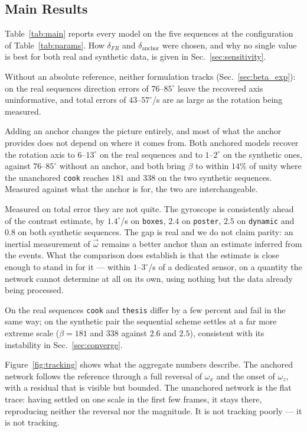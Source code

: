 \documentclass[journal]{IEEEtran}
\newcommand{\wvec}{\vec{\omega}}
\begin{document}
\subsection{Main Results}
\label{sec:mainresults}

Table~\ref{tab:main} reports every model on the five sequences at the
configuration of Table~\ref{tab:params}. How $\delta_{F\!R}$ and
$\delta_{\text{anchor}}$ were chosen, and why no single value is best for
both real and synthetic data, is given in Sec.~\ref{sec:sensitivity}.

Without an absolute reference, neither formulation tracks
(Sec.~\ref{sec:beta_exp}): on the real sequences direction errors of
$76$--$85^\circ$ leave the recovered axis uninformative, and total errors of
$43$--$57^\circ$/s are as large as the rotation being measured.

Adding an anchor changes the picture entirely, and most of what the anchor
provides does not depend on where it comes from. Both anchored models recover the
rotation axis to $6$--$13^\circ$ on the real sequences and to $1$--$2^\circ$ on
the synthetic ones, against $76$--$85^\circ$ without an anchor, and both bring
$\beta$ to within $14\%$ of unity where the unanchored \texttt{cook} reaches
$181$ and $338$ on the two synthetic sequences. Measured against what the anchor
is for, the two are interchangeable.

Measured on total error they are not quite. The gyroscope is consistently ahead
of the contrast estimate, by $1.4^\circ$/s on \texttt{boxes}, $2.4$ on
\texttt{poster}, $2.5$ on \texttt{dynamic} and $0.8$ on both synthetic
sequences. The gap is real and we do
not claim parity: an inertial measurement of $\wvec$ remains a better anchor than
an estimate inferred from the events. What the comparison does establish is that
the estimate is close enough to stand in for it --- within $1$--$3^\circ$/s of a
dedicated sensor, on a quantity the network cannot determine at all on its own,
using nothing but the data already being processed.

On the real sequences \texttt{cook} and \texttt{thesis} differ by a few
percent and fail in the same way; on the synthetic pair the sequential scheme
settles at a far more extreme scale ($\beta = 181$ and $338$ against
$2.6$ and $2.5$), consistent with its instability in Sec.~\ref{sec:converge}.

Figure~\ref{fig:tracking} shows what the aggregate numbers describe. The
anchored network follows the reference through a full reversal of $\omega_x$ and
the onset of $\omega_z$, with a residual that is visible but bounded. The
unanchored network is the flat trace: having settled on one scale in the first
few frames, it stays there, reproducing neither the reversal nor the magnitude.
It is not tracking poorly --- it is not tracking.
\end{document}
